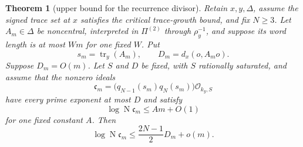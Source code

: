 \documentclass[11pt,reqno]{amsart}
\newtheorem{theorem}{Theorem}[section]
\theoremstyle{definition}
\theoremstyle{remark}
\newcommand{\cO}{\mathcal O}
\newcommand{\Tr}{\operatorname{tr}}
\newcommand{\Norm}{\operatorname{N}}
\begin{document}
\begin{theorem}[upper bound for the recurrence divisor]
\label{thm:recurrence-divisor-upper}
Retain \(x,y,\Delta\), assume the signed trace set at \(x\) satisfies the
critical trace-growth bound, and fix \(N\ge3\).  Let
\(A_m\in\Delta\) be noncentral, interpreted in \(\Pi^{(2)}\) through
\(\rho_y^{-1}\), and suppose its word length is at most \(Wm\) for one
fixed \(W\).  Put
\[
 s_m=\Tr_y(A_m),\qquad D_m=d_x(o,A_mo).
\]
Suppose \(D_m=O(m)\).  Let \(S\) and \(D\) be fixed, with \(S\)
rationally saturated, and assume that the nonzero ideals
\[
 \mathfrak c_m=
 \bigl(q_{N-1}(s_m)q_N(s_m)\bigr)\cO_{k_y,S}
\]
have every prime exponent at most \(D\) and satisfy
\begin{equation}\label{eq:upper-ideal-linear-bound}
 \log\Norm\mathfrak c_m\le Am+O(1)
\end{equation}
for one fixed constant \(A\).  Then
\begin{equation}\label{eq:recurrence-divisor-upper}
 \log\Norm\mathfrak c_m
 \le\frac{2N-1}{2}D_m+o(m).
\end{equation}
\end{theorem}
\end{document}
